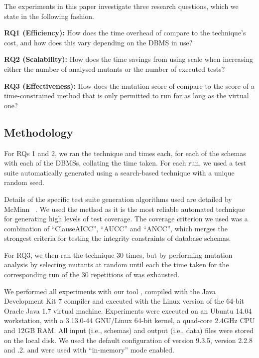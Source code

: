 The experiments in this paper investigate three research questions, which we state in the following fashion.

\vspace{5pt}

\noindent
\textbf{RQ1 (Efficiency):} How does the time overhead of \vma compare to the \Standard technique's cost, and how does
this vary depending on the DBMS in use?

\vspace{5pt}

\noindent
\textbf{RQ2 (Scalability):} How does the time savings from using \vma scale when increasing either the number
of analysed mutants or the number of executed tests?

\vspace{5pt}


\noindent
\textbf{RQ3 (Effectiveness):} How does the mutation score of \vma compare to the score of a time-constrained method that
is only permitted to run for as long as the virtual one?

\subsection{Methodology}
\label{sec:methodology}

For RQs 1 and 2, we ran the \Original technique and  times each, for each of the schemas with each of the DBMSs, collating the time taken. For each run, we used a test suite automatically generated using a search-based technique with a unique random seed.

Details of the specific test suite generation algorithms used are detailed by McMinn \etal~\cite{McMinn2015}. We used the \AVM method as it is the most reliable automated technique for generating high levels of test coverage. The coverage criterion we used was a combination of ``ClauseAICC'', ``AUCC'' and ``ANCC'', which merges the strongest criteria for testing the integrity constraints of database schemas.

For RQ3, we then ran the \Original technique 30 times, but by performing mutation analysis by selecting mutants at random until each the time taken for the corresponding run of the 30 repetitions of \vma was exhausted.

We performed all experiments with our \SA tool \cite{Kapfhammer2013,Wright2014,McMinn2015},
compiled with the Java Development Kit 7 compiler and executed with the Linux version of the 64-bit Oracle Java 1.7 virtual machine. Experiments were executed on an Ubuntu 14.04 workstation, with a 3.13.0-44 GNU/Linux 64-bit kernel, a quad-core 2.4GHz CPU and 12GB RAM. All input (i.e., schemas) and output (i.e., data) files were stored on the local disk. We used the default configuration of \PostgreSQL version 9.3.5, \HyperSQL version 2.2.8 and .2. \HyperSQL and \SQLite were used with ``in-memory'' mode enabled.

